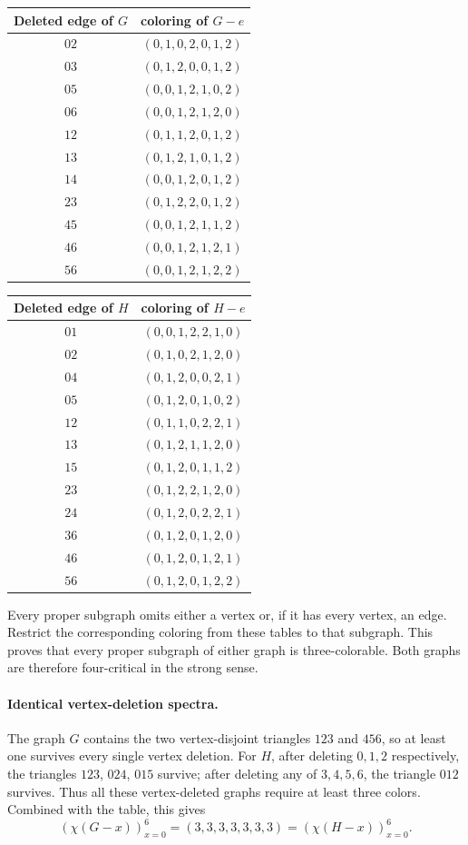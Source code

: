 \documentclass[10pt]{article}
\begin{document}
\begin{center}
\begin{tabular}{c|c}
Deleted edge of $G$ & coloring of $G-e$\\ \hline
$02$ & $(0,1,0,2,0,1,2)$ \\
$03$ & $(0,1,2,0,0,1,2)$ \\
$05$ & $(0,0,1,2,1,0,2)$ \\
$06$ & $(0,0,1,2,1,2,0)$ \\
$12$ & $(0,1,1,2,0,1,2)$ \\
$13$ & $(0,1,2,1,0,1,2)$ \\
$14$ & $(0,0,1,2,0,1,2)$ \\
$23$ & $(0,1,2,2,0,1,2)$ \\
$45$ & $(0,0,1,2,1,1,2)$ \\
$46$ & $(0,0,1,2,1,2,1)$ \\
$56$ & $(0,0,1,2,1,2,2)$ \\
\end{tabular}\qquad
\begin{tabular}{c|c}
Deleted edge of $H$ & coloring of $H-e$\\ \hline
$01$ & $(0,0,1,2,2,1,0)$ \\
$02$ & $(0,1,0,2,1,2,0)$ \\
$04$ & $(0,1,2,0,0,2,1)$ \\
$05$ & $(0,1,2,0,1,0,2)$ \\
$12$ & $(0,1,1,0,2,2,1)$ \\
$13$ & $(0,1,2,1,1,2,0)$ \\
$15$ & $(0,1,2,0,1,1,2)$ \\
$23$ & $(0,1,2,2,1,2,0)$ \\
$24$ & $(0,1,2,0,2,2,1)$ \\
$36$ & $(0,1,2,0,1,2,0)$ \\
$46$ & $(0,1,2,0,1,2,1)$ \\
$56$ & $(0,1,2,0,1,2,2)$ \\
\end{tabular}
\end{center}

Every proper subgraph omits either a vertex or, if it has every
vertex, an edge. Restrict the corresponding coloring from these
tables to that subgraph. This proves that every proper subgraph
of either graph is three-colorable. Both graphs are therefore
four-critical in the strong sense.

\paragraph{Identical vertex-deletion spectra.}
The graph $G$ contains the two vertex-disjoint triangles $123$
and $456$, so at least one survives every single vertex deletion.
For $H$, after deleting $0,1,2$ respectively, the triangles
$123$, $024$, $015$ survive; after deleting any of $3,4,5,6$,
the triangle $012$ survives. Thus all these vertex-deleted graphs
require at least three colors. Combined with the table, this gives
\[
 (\chi(G-x))_{x=0}^6=(3,3,3,3,3,3,3)
   =(\chi(H-x))_{x=0}^6.
\]
\end{document}
